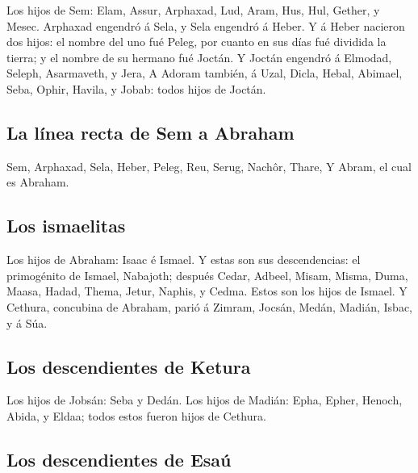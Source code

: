  Los hijos de Sem: Elam, Assur, Arphaxad, Lud, Aram, Hus,
Hul, Gether, y Mesec.  Arphaxad engendró á Sela, y Sela
engendró á Heber.  Y á Heber nacieron dos hijos: el
nombre del uno fué Peleg, por cuanto en sus días fué dividida la tierra;
y el nombre de su hermano fué Joctán.  Y Joctán engendró
á Elmodad, Seleph, Asarmaveth, y Jera,  A Adoram también,
á Uzal, Dicla,  Hebal, Abimael, Seba, 
Ophir, Havila, y Jobab: todos hijos de Joctán.

\hypertarget{la-luxednea-recta-de-sem-a-abraham}{%
\subsection{La línea recta de Sem a
Abraham}\label{la-luxednea-recta-de-sem-a-abraham}}

 Sem, Arphaxad, Sela,  Heber, Peleg, Reu,
 Serug, Nachôr, Thare,  Y Abram, el cual
es Abraham.

\hypertarget{los-ismaelitas}{%
\subsection{Los ismaelitas}\label{los-ismaelitas}}

 Los hijos de Abraham: Isaac é Ismael.  Y
estas son sus descendencias: el primogénito de Ismael, Nabajoth; después
Cedar, Adbeel, Misam,  Misma, Duma, Maasa, Hadad, Thema,
Jetur, Naphis, y Cedma. Estos son los hijos de Ismael.  Y
Cethura, concubina de Abraham, parió á Zimram, Jocsán, Medán, Madián,
Isbac, y á Súa.

\hypertarget{los-descendientes-de-ketura}{%
\subsection{Los descendientes de
Ketura}\label{los-descendientes-de-ketura}}

 Los hijos de Jobsán: Seba y Dedán.  Los
hijos de Madián: Epha, Epher, Henoch, Abida, y Eldaa; todos estos fueron
hijos de Cethura.

\hypertarget{los-descendientes-de-esauxfa}{%
\subsection{Los descendientes de
Esaú}\label{los-descendientes-de-esauxfa}}

